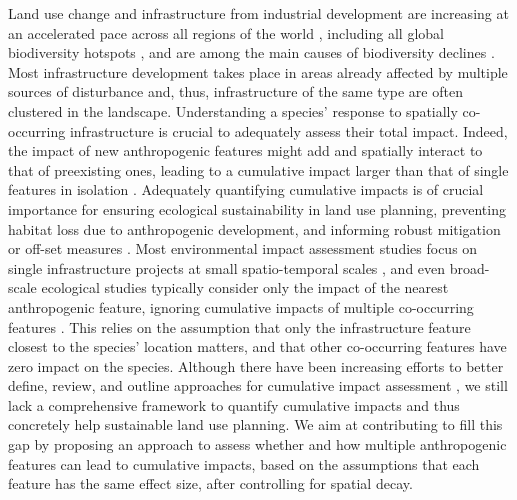 \documentclass[titlepage]{article}
\begin{document}
Land use change and infrastructure from industrial development are increasing at an accelerated pace across all regions of the world \citep{venter_sixteen_2016,ibisch_global_2016}, including all global biodiversity hotspots \citep{sloan_remaining_2014}, and are among the main causes of biodiversity declines \citep{benitez-lopez_impacts_2010,newbold_global_2015}. Most infrastructure development takes place in areas already affected by multiple sources of disturbance \citep{barber_roads_2014} and, thus, infrastructure of the same type are often clustered in the landscape. Understanding a species' response to spatially co-occurring infrastructure is crucial to adequately assess their total impact. Indeed, the impact of new anthropogenic features might add and spatially interact to that of preexisting ones, leading to a cumulative impact larger than that of 
single features in isolation \citep[Box 1; ][]{gillingham_integration_2016,naugle_unifying_2011}.  
Adequately quantifying cumulative impacts is of crucial importance for ensuring ecological sustainability in land use planning, preventing habitat loss due to anthropogenic development, and informing robust mitigation or off-set measures \citep{gillingham_integration_2016, laurance_roads_2017}. Most environmental impact assessment studies focus on single infrastructure projects at small spatio-temporal scales \citep{johnson_regulating_2011}, and even broad-scale ecological studies typically consider only the impact of the nearest anthropogenic feature, ignoring cumulative impacts of multiple co-occurring features \citep[e.g.][]{torres_assessing_2016}. This relies on the assumption that only the infrastructure feature closest to the species' location matters, and that other co-occurring features have zero impact on the species. Although there have been increasing efforts to better define, review, and outline approaches for cumulative impact assessment \citep{naugle_unifying_2011,gillingham_integration_2016}, we still lack a comprehensive framework to quantify cumulative impacts and thus concretely help sustainable land use planning. We aim at contributing to fill this gap by proposing an approach to assess whether and how multiple anthropogenic features can lead to cumulative impacts, based on the assumptions that each feature has the same effect size, after controlling for spatial decay.
\end{document}
